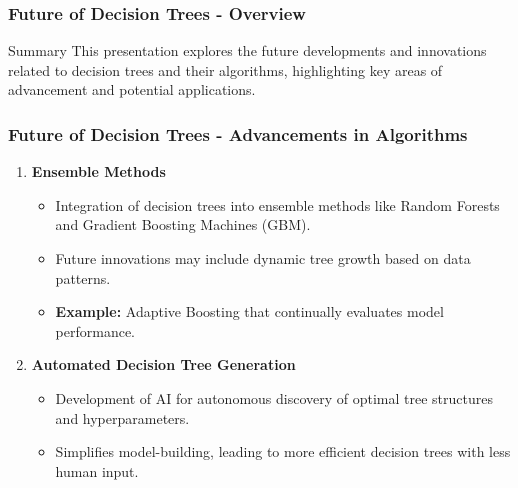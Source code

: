 \documentclass[aspectratio=169]{beamer}
\begin{document}
\begin{frame}[fragile]
    \frametitle{Future of Decision Trees - Overview}
    \begin{block}{Summary}
        This presentation explores the future developments and innovations related to decision trees and their algorithms, highlighting key areas of advancement and potential applications.
    \end{block}
\end{frame}

\begin{frame}[fragile]
    \frametitle{Future of Decision Trees - Advancements in Algorithms}
    \begin{enumerate}
        \item \textbf{Ensemble Methods}
            \begin{itemize}
                \item Integration of decision trees into ensemble methods like Random Forests and Gradient Boosting Machines (GBM).
                \item Future innovations may include dynamic tree growth based on data patterns.
                \item \textbf{Example:} Adaptive Boosting that continually evaluates model performance.
            \end{itemize}
            
        \item \textbf{Automated Decision Tree Generation}
            \begin{itemize}
                \item Development of AI for autonomous discovery of optimal tree structures and hyperparameters.
                \item Simplifies model-building, leading to more efficient decision trees with less human input.
            \end{itemize}
    \end{enumerate}
\end{frame}
\end{document}

